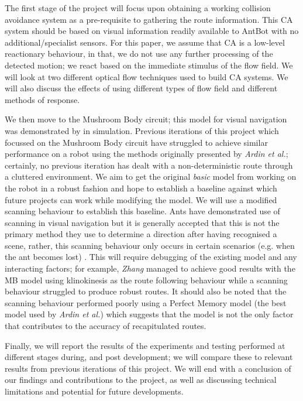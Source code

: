 \documentclass[a4paper,11pt,twoside,openright]{article}
\begin{document}
The first stage of the project will focus upon obtaining a working collision avoidance system as a
pre-requisite to gathering the route information. This CA system should be based on visual
information readily available to AntBot with no additional/specialist sensors. For this paper, we
assume that CA is a low-level reactionary behaviour, in that, we do not use any further processing
of the detected motion; we react based on the immediate stimulus of the flow
field. We will look at two different optical flow techniques used to build CA systems. We will also
discuss the effects of using different types of flow field and different methods of response.
\newline

We then move to the Mushroom Body circuit; this model for visual navigation was demonstrated by
\cite{Ardin2016} in simulation. Previous iterations of this project which focussed on the Mushroom
Body circuit have struggled to achieve similar performance on a robot using the methods originally
presented by \textit{Ardin et al.}; certainly, no previous iteration
has dealt with a non-deterministic route through a cluttered environment. We aim to get the original
\textit{basic} model from \cite{Ardin2016} working on the robot in a robust fashion and hope to
establish a baseline against which future projects can work while modifying the model. We will use
a modified scanning behaviour to establish this baseline. Ants have demonstrated use of scanning in
visual navigation but it is generally accepted that this
is not the primary method they use to determine a direction after having recognised a scene, rather,
this scanning behaviour only occurs in certain scenarios (e.g. when the ant becomes lost)
\cite{Kodzhabashev2015}. This will require debugging of the existing model and any interacting
factors; for example, \textit{Zhang} managed to achieve good results with the MB model using
klinokinesis as the route following behaviour while a scanning behaviour struggled to produce robust routes.
It should also be noted that the scanning behaviour performed poorly using a Perfect Memory model \cite{Zhang2017}
(the best model used by \textit{Ardin et al.}) which suggests that the model is
not the only factor that contributes to the accuracy of recapitulated routes.
\newline

Finally, we will report the results of the experiments and testing performed at different stages during, and
post development; we will compare these to relevant results from previous iterations of
this project. We will end with a conclusion of our findings and contributions to the project,
as well as discussing technical limitations and potential for future developments.
\newpage
\end{document}
